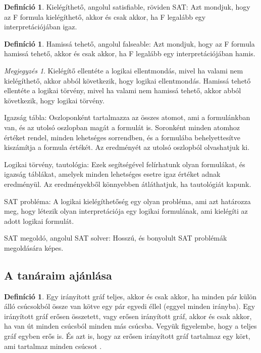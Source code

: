 \documentclass[
]{thesis-ekf}
\theoremstyle{definition}
\newtheorem{definicio}[tetel]{Definíció}
\theoremstyle{remark}
\newtheorem{megjegyzes}[tetel]{Megjegyzés}
\begin{document}
	\begin{definicio}
		Kielégíthető, angolul satisfiable, röviden SAT: Azt mondjuk, hogy az F formula kielégíthető, akkor és csak akkor, ha F legalább egy interpretációjában igaz.
	\end{definicio}
	\begin{definicio}
		Hamissá tehető, angolul falseable: Azt mondjuk, hogy az F formula hamissá tehető, akkor és csak akkor, ha F legalább egy interpretációjában hamis. 
	\end{definicio}
	\begin{megjegyzes}
		Kielégítő ellentéte a logikai ellentmondás, mivel ha valami nem kielégíthető, akkor abból következik, hogy logikai ellentmondás.
		Hamissá tehető ellentéte a logikai törvény, mivel ha valami nem hamissá tehető, akkor abból következik, hogy logikai törvény.
	\end{megjegyzes}

	Igazság tábla: Oszloponként tartalmazza az összes atomot, ami a formulánkban van, és az utolsó oszlopban magát a formulát is. Soronként minden atomhoz értéket rendel, minden lehetséges sorrendben, és a formulába behelyettesítve kiszámítja a formula értékét. Az eredményét az utolsó oszlopból olvashatjuk ki.
	
	Logikai törvény, tautológia: Ezek segítségével felírhatunk olyan formulákat, és igazság táblákat, amelyek minden lehetséges esetre igaz értéket adnak eredményül. Az eredményekből könnyebben átláthatjuk, ha tautológiát kapunk.
	
	SAT probléma: A logikai kielégíthetőség egy olyan probléma, ami azt határozza meg, hogy létezik olyan interpretációja egy logikai formulának, ami kielégíti az adott logikai formulát.
	
	SAT megoldó, angolul SAT solver: Hosszú, és bonyolult SAT problémák megoldására képes.

	\subsection{A tanáraim ajánlása}\label{szakirodalom}
	\begin{definicio}
		Egy irányított gráf teljes, akkor és csak akkor, ha minden pár külön álló csúcsokból össze van kötve egy pár egyedi éllel (eggyel minden irányba). Egy irányított gráf erősen összetett, vagy erősen irányított gráf, akkor és csak akkor, ha van út minden csúcsból minden más csúcsba. Vegyük figyelembe, hogy a teljes gráf egyben erős is. És azt is, hogy az erősen irányított gráf tartalmaz egy kört, ami tartalmaz minden csúcsot \cite{synasc2020}.
	\end{definicio}
\end{document}
